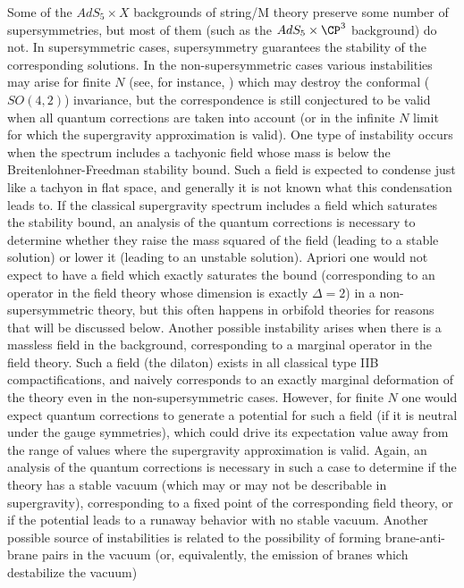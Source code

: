 Some of the $AdS_5\times X$ backgrounds of string/M theory preserve
some number of supersymmetries, but most of them (such as the
$AdS_5\times \CP^3$ background) do not. In supersymmetric cases,
supersymmetry guarantees the stability of the corresponding solutions.
In the non-supersymmetric cases various instabilities may arise for
finite $N$ (see, for instance, \cite{Berkooz:1999qp,Berkooz:1999ji}) which may
destroy the conformal ($SO(4,2)$) invariance, but the correspondence
is still conjectured to be valid when all quantum corrections are taken
into account (or in the infinite $N$ limit for which the supergravity
approximation is valid). One type of instability
occurs when the spectrum includes a
tachyonic field whose mass is below the Breitenlohner-Freedman
stability bound. Such a field is expected to condense just like a
tachyon in flat space, and generally it is not known what this
condensation leads to. If the classical supergravity spectrum includes
a field which saturates the stability bound, an analysis of the
quantum corrections is necessary to determine whether they raise the
mass squared of the field (leading to a stable solution) or lower it
(leading to an unstable solution). Apriori one would not expect to
have a field which exactly saturates the bound (corresponding to an
operator in the field theory whose dimension is exactly $\Delta=2$) in
a non-supersymmetric theory, but this often happens in orbifold
theories for reasons that will be discussed below. Another possible
instability arises when there is a massless field in the background,
corresponding to a marginal operator in the field theory. Such a field
(the dilaton) exists in all classical type IIB compactifications, and
naively corresponds to an exactly marginal deformation of the theory
even in the non-supersymmetric cases. However, for finite $N$ one
would expect quantum corrections to generate a potential for such a
field (if it is neutral under the gauge symmetries), which could drive
its expectation value away from the range of values where the
supergravity approximation is valid. Again, an analysis of the quantum
corrections is necessary in such a case to determine if the theory has
a stable vacuum (which may or may not be describable in supergravity),
corresponding to a fixed point of the corresponding field theory, or
if the potential leads to a runaway behavior with no stable
vacuum. Another possible source of instabilities is related to the
possibility of forming brane-anti-brane pairs in the vacuum (or,
equivalently, the emission of branes which destabilize the vacuum)
